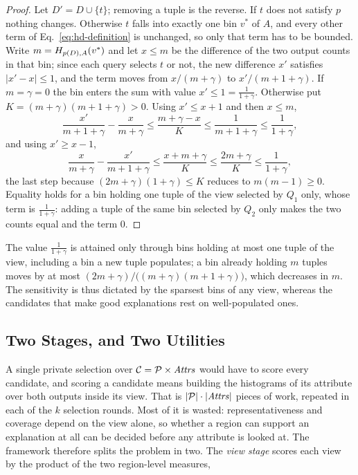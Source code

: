 \begin{proof}
Let $D'=D\cup\{t\}$; removing a tuple is the reverse.
If $t$ does not satisfy $p$ nothing changes.
Otherwise $t$ falls into exactly one bin $v^*$ of $A$, and every other term of Eq.~\eqref{eq:hd-definition} is unchanged, so only that term has to be bounded.
Write $m=H_{p(D),A}(v^*)$ and let $x\le m$ be the difference of the two output counts in that bin; since each query selects $t$ or not, the new difference $x'$ satisfies $|x'-x|\le1$, and the term moves from $x/(m+\gamma)$ to $x'/(m+1+\gamma)$.
If $m=\gamma=0$ the bin enters the sum with value $x'\le1=\frac{1}{1+\gamma}$.
Otherwise put $K=(m+\gamma)(m+1+\gamma)>0$. Using $x'\le x+1$ and then $x\le m$,
\[
\frac{x'}{m+1+\gamma}-\frac{x}{m+\gamma}\le\frac{m+\gamma-x}{K}\le\frac{1}{m+1+\gamma}\le\frac{1}{1+\gamma},
\]
and using $x'\ge x-1$,
\[
\frac{x}{m+\gamma}-\frac{x'}{m+1+\gamma}\le\frac{x+m+\gamma}{K}\le\frac{2m+\gamma}{K}\le\frac{1}{1+\gamma},
\]
the last step because $(2m+\gamma)(1+\gamma)\le K$ reduces to $m(m-1)\ge0$.
Equality holds for a bin holding one tuple of the view selected by $Q_1$ only, whose term is $\frac{1}{1+\gamma}$: adding a tuple of the same bin selected by $Q_2$ only makes the two counts equal and the term $0$.
\end{proof}

The value $\frac{1}{1+\gamma}$ is attained only through bins holding at most one tuple of the view, including a bin a new tuple populates; a bin already holding $m$ tuples moves by at most $(2m+\gamma)/\big((m+\gamma)(m+1+\gamma)\big)$, which decreases in $m$.
The sensitivity is thus dictated by the sparsest bins of any view, whereas the candidates that make good explanations rest on well-populated ones.

\subsection{Two Stages, and Two Utilities}
\label{subsec:two-stages}

A single private selection over $\mathcal{C}=\mathcal{P}\times\mathit{Attrs}$ would have to score every candidate, and scoring a candidate means building the histograms of its attribute over both outputs inside its view.
That is $|\mathcal{P}|\cdot|\mathit{Attrs}|$ pieces of work, repeated in each of the $k$ selection rounds.
Most of it is wasted: representativeness and coverage depend on the view alone, so whether a region can support an explanation at all can be decided before any attribute is looked at.
The framework therefore splits the problem in two.
The \emph{view stage} scores each view by the product of the two region-level measures,

